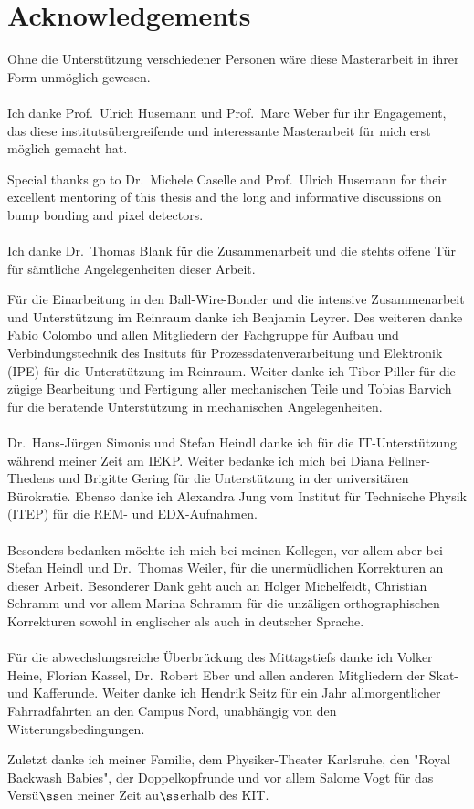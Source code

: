 
\chapter*{Acknowledgements}
Ohne die Unterst\"utzung verschiedener Personen w\"are diese Masterarbeit in ihrer Form unm\"oglich gewesen.
\\
\\
Ich danke Prof.~Ulrich Husemann und Prof.~Marc Weber f\"ur ihr Engagement, das diese instituts\"ubergreifende und interessante Masterarbeit f\"ur mich erst m\"oglich gemacht hat.

Special thanks go to Dr.~Michele Caselle and Prof.~Ulrich Husemann for their excellent mentoring of this thesis and the long and informative discussions on bump bonding and pixel detectors.
\\
\\
Ich danke Dr.~Thomas Blank f\"ur die Zusammenarbeit und die stehts offene T\"ur f\"ur s\"amtliche Angelegenheiten dieser Arbeit.

F\"ur die Einarbeitung in den Ball-Wire-Bonder und die intensive Zusammenarbeit und Unterst\"utzung im Reinraum danke ich Benjamin Leyrer. Des weiteren danke Fabio Colombo und allen Mitgliedern der Fachgruppe f\"ur Aufbau und Verbindungstechnik des Insituts f\"ur Prozessdatenverarbeitung und Elektronik (IPE) f\"ur die Unterst\"utzung im Reinraum. Weiter danke ich Tibor Piller f\"ur die z\"ugige Bearbeitung und Fertigung aller mechanischen Teile und Tobias Barvich f\"ur die beratende Unterst\"utzung in mechanischen Angelegenheiten.
\\
\\
Dr.~Hans-J\"urgen Simonis und Stefan Heindl danke ich f\"ur die IT-Unterst\"utzung w\"ahrend meiner Zeit am \ac{IEKP}. Weiter bedanke ich mich bei Diana Fellner-Thedens und Brigitte Gering f\"ur die Unterst\"utzung in der universit\"aren B\"urokratie. Ebenso danke ich Alexandra Jung vom Institut f\"ur Technische Physik (ITEP) f\"ur die REM- und EDX-Aufnahmen.
\\
\\
Besonders bedanken m\"ochte ich mich bei meinen Kollegen, vor allem aber bei Stefan Heindl und Dr.~Thomas Weiler, f\"ur die unerm\"udlichen Korrekturen an dieser Arbeit. Besonderer Dank geht auch an Holger Michelfeidt, Christian Schramm und vor allem Marina Schramm f\"ur die unz\"aligen orthographischen Korrekturen sowohl in englischer als auch in deutscher Sprache.
\\
\\
F\"ur die abwechslungsreiche \"Uberbr\"uckung des Mittagstiefs danke ich Volker Heine, Florian Kassel, Dr.~Robert Eber und allen anderen Mitgliedern der Skat- und Kafferunde. Weiter danke ich Hendrik Seitz f\"ur ein Jahr allmorgentlicher Fahrradfahrten an den Campus Nord, unabh\"angig von den Witterungsbedingungen.

Zuletzt danke ich meiner Familie, dem Physiker-Theater Karlsruhe, den "Royal Backwash Babies", der Doppelkopfrunde und vor allem Salome Vogt f\"ur das Vers\"u$\rm{\ss}$en meiner Zeit au$\rm{\ss}$erhalb des \acs{KIT}.
